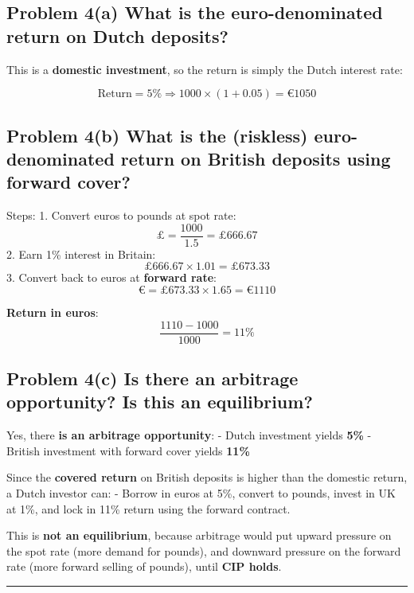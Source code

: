 \documentclass[
]{article}
\begin{document}
\subsection{Problem 4(a) What is the euro-denominated return on Dutch
deposits?}\label{problem-4a-what-is-the-euro-denominated-return-on-dutch-deposits}

This is a \textbf{domestic investment}, so the return is simply the
Dutch interest rate:

\[
\text{Return} = 5\%
\Rightarrow 1000 \times (1 + 0.05) = €1050
\]

\subsection{Problem 4(b) What is the (riskless) euro-denominated return
on British deposits using forward
cover?}\label{problem-4b-what-is-the-riskless-euro-denominated-return-on-british-deposits-using-forward-cover}

Steps: 1. Convert euros to pounds at spot rate:\\
\[
   £ = \frac{1000}{1.5} = £666.67
   \] 2. Earn 1\% interest in Britain:\\
\[
   £666.67 \times 1.01 = £673.33
   \] 3. Convert back to euros at \textbf{forward rate}: \[
   € = £673.33 \times 1.65 = €1110
   \]

\textbf{Return in euros}: \[
\frac{1110 - 1000}{1000} = 11\%
\]

\subsection{Problem 4(c) Is there an arbitrage opportunity? Is this an
equilibrium?}\label{problem-4c-is-there-an-arbitrage-opportunity-is-this-an-equilibrium}

Yes, there \textbf{is an arbitrage opportunity}: - Dutch investment
yields \textbf{5\%} - British investment with forward cover yields
\textbf{11\%}

Since the \textbf{covered return} on British deposits is higher than the
domestic return, a Dutch investor can: - Borrow in euros at 5\%, convert
to pounds, invest in UK at 1\%, and lock in 11\% return using the
forward contract.

This is \textbf{not an equilibrium}, because arbitrage would put upward
pressure on the spot rate (more demand for pounds), and downward
pressure on the forward rate (more forward selling of pounds), until
\textbf{CIP holds}.

\begin{center}\rule{0.5\linewidth}{0.5pt}\end{center}
\end{document}
